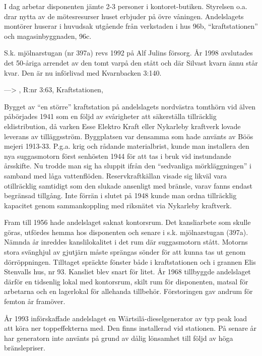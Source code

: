 I dag arbetar disponenten jämte 2-3 personer i kontoret-butiken. Styrelsen o.a. drar nytta av de mötesresurser huset erbjuder på övre 	våningen. Andelslagets montörer huserar i huvudsak utgående från verkstaden i hus 96b, ``kraftstationen'' och magasinbyggnaden, 96c.

S.k. mjölnarstugan (nr 397a) revs 1992 på Alf Julins försorg. År 1998 avslutades det 50-åriga arrendet av den tomt varpå den stått och där Silvast kvarn ännu står kvar. Den är nu införlivad med Kvarnbacken 3:140.


---> , R:nr 3:63,	Kraftstationen, 

Bygget av ``en större'' kraftstation på andelslagets nordvästra tomthörn vid älven påbörjades 1941 som en följd av svårigheter att 	säkerställa tillräcklig eldistribution, då varken Esse Elektro Kraft eller Nykarleby kraftverk lovade leverans av tilläggsström. Byggplatsen var densamma som hade använts av Böös mejeri 1913-33. P.g.a. krig och rådande materialbrist, kunde man installera den nya suggasmotorn först senhösten 1944 för att tas i bruk vid instundande årsskifte. Nu trodde man sig ha sluppit ifrån den ``sedvanliga mörkläggningen'' i samband med låga vattenflöden. Reservkraftkällan visade sig likväl vara otillräcklig samtidigt som den slukade ansenligt med bränsle, varav fanns endast begränsad tillgång. Inte förrän i slutet på 1948 kunde man ordna tillräcklig kapacitet genom sammankoppling med riksnätet via Nykarleby kraftverk.


Fram till 1956 hade andelslaget saknat kontorsrum. Det kansliarbete som skulle göras, utfördes hemma hos disponenten och senare i s.k. mjölnarstugan (397a). Nämnda år inreddes kanslilokalitet i det rum där suggasmotorn stått. Motorns stora svänghjul av gjutjärn måste sprängas sönder för att kunna tas ut genom dörröppningen. Tilltaget spräckte fönster både i kraftstationen och i grannen Elis Stenvalls hus, nr 93. Kansliet blev snart för litet. År 1968 tillbyggde andelslaget därför en tidsenlig lokal med kontorsrum, skilt rum för disponenten, matsal för arbetarna och en lagerlokal för allehanda tillbehör. Förstoringen gav andrum för femton år framöver.

År 1993 införskaffade andelslaget en Wärtsilä-dieselgenerator av typ peak load att köra ner toppeffekterna med. Den finns installerad vid 	stationen. På senare år har generatorn inte använts på grund av dålig lönsamhet till följd av höga bränslepriser.

